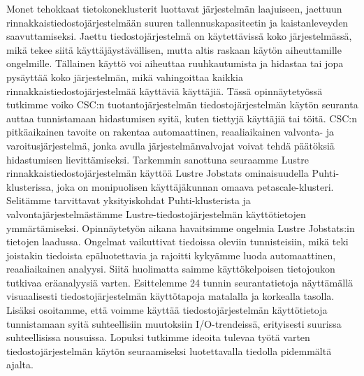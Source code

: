 \makecoverpage
\makecopyrightpage

\begin{abstractpage}[english]
\abstracttext
\end{abstractpage}



\begin{abstractpage}[finnish]
Monet tehokkaat tietokoneklusterit luottavat järjestelmän laajuiseen, jaettuun rinnakkaistiedostojärjestelmään suuren tallennuskapasiteetin ja kaistanleveyden saavuttamiseksi.
Jaettu tiedostojärjestelmä on käytettävissä koko järjestelmässä, mikä tekee siitä käyttäjäystävällisen, mutta altis raskaan käytön aiheuttamille ongelmille.
Tällainen käyttö voi aiheuttaa ruuhkautumista ja hidastaa tai jopa pysäyttää koko järjestelmän, mikä vahingoittaa kaikkia rinnakkaistiedostojärjestelmää käyttäviä käyttäjiä.
Tässä opinnäytetyössä tutkimme voiko CSC:n tuotantojärjestelmän tiedostojärjestelmän käytön seuranta auttaa tunnistamaan hidastumisen syitä, kuten tiettyjä käyttäjiä tai töitä.
CSC:n pitkäaikainen tavoite on rakentaa automaattinen, reaaliaikainen valvonta- ja varoitusjärjestelmä, jonka avulla järjestelmänvalvojat voivat tehdä päätöksiä hidastumisen lievittämiseksi.
Tarkemmin sanottuna seuraamme Lustre rinnakkaistiedostojärjestelmän käyttöä Lustre Jobstats ominaisuudella Puhti-klusterissa, joka on monipuolisen käyttäjäkunnan omaava petascale-klusteri.
Selitämme tarvittavat yksityiskohdat Puhti-klusterista ja valvontajärjestelmästämme Lustre-tiedostojärjestelmän käyttötietojen ymmärtämiseksi.
Opinnäytetyön aikana havaitsimme ongelmia Lustre Jobstats:in tietojen laadussa.
Ongelmat vaikuttivat tiedoissa oleviin tunnisteisiin, mikä teki joistakin tiedoista epäluotettavia ja rajoitti kykyämme luoda automaattinen, reaaliaikainen analyysi.
Siitä huolimatta saimme käyttökelpoisen tietojoukon tutkivaa eräanalyysiä varten.
Esittelemme 24 tunnin seurantatietoja näyttämällä visuaalisesti tiedostojärjestelmän käyttötapoja matalalla ja korkealla tasolla.
Lisäksi osoitamme, että voimme käyttää tiedostojärjestelmän käyttötietoja tunnistamaan syitä suhteellisiin muutoksiin I/O-trendeissä, erityisesti suurissa suhteellisissa nousuissa.
Lopuksi tutkimme ideoita tulevaa työtä varten tiedostojärjestelmän käytön seuraamiseksi luotettavalla tiedolla pidemmältä ajalta.
\end{abstractpage}


